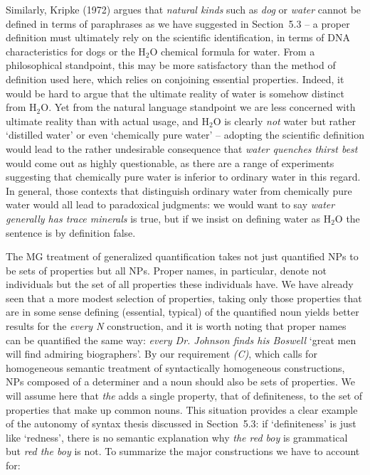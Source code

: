Similarly, Kripke (1972) argues that {\it natural kinds}
such as {\it dog} or {\it water} cannot be defined in terms of paraphrases as
we have suggested in Section~5.3 -- a proper definition must ultimately rely
on the scientific identification, in terms of DNA characteristics for dogs or
the H$_2$O chemical formula for water. From a philosophical standpoint, this
may be more satisfactory than the method of definition used here, which relies
on conjoining essential properties. Indeed, it would be hard to argue that the
ultimate reality of water is somehow distinct from H$_2$O. Yet from the
natural language standpoint we are less concerned with ultimate reality than
with actual usage, and H$_2$O is clearly {\it not} water but rather `distilled
water' or even `chemically pure water' -- adopting the scientific definition
would lead to the rather undesirable consequence that {\it water quenches
  thirst best} would come out as highly questionable, as there are a range of
experiments suggesting that chemically pure water is inferior to ordinary
water in this regard. In general, those contexts that distinguish ordinary
water from chemically pure water would all lead to paradoxical judgments: we
would want to say {\it water generally has trace minerals} is true, but if we
insist on defining water as H$_2$O the sentence is by definition false.

The MG treatment of generalized quantification takes not just quantified NPs
to be sets of properties but all NPs. Proper names, in particular, denote not
individuals but the set of all properties these individuals have. We have
already seen that a more modest selection of properties, taking only those
properties that are in some sense defining (essential, typical) of the
quantified noun yields better results for the {\it every N} construction, and
it is worth noting that proper names can be quantified the same way: {\it
  every Dr. Johnson finds his Boswell} `great men will find admiring
biographers'. By our requirement {\sl (C)}, which calls for homogeneous
semantic treatment of syntactically homogeneous constructions, NPs composed 
of a determiner and a noun should also be sets of properties. We will assume 
here that {\it the} adds a single property, that of definiteness, to the 
set of properties that make up common nouns. This situation provides a 
clear example of the autonomy of syntax thesis discussed in Section~5.3: if
`definiteness' is just like `redness', there is no semantic explanation why 
{\it the red boy} is grammatical but {\it *red the boy} is not. To summarize
the major constructions we have to account for: 

